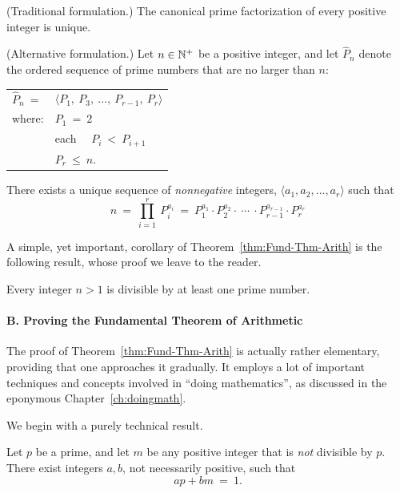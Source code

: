 \begin{theorem}
\label{thm:Fund-Thm-Arith}

\noindent
{\rm (Traditional formulation.)}
%
The canonical prime factorization of every positive integer is unique.

\noindent
{\rm (Alternative formulation.)}
%
Let $n \in \mathbb{N}^+$ be a positive integer, and let $\widehat{P}_n$ denote the
ordered sequence of prime numbers that are no larger than $n$:

\begin{tabular}{ll}
$\widehat{P}_n \ =$  & $\langle P_1, \ P_3, \ \ldots, \ P_{r-1}, \ P_r \rangle$ \\
where:               & $P_1 \ = \ 2$ \\
                     & each  \ \ $P_i \ < \ P_{i+1}$ \\
                     & $P_r \ \leq \ n$.
\end{tabular}

\noindent
There exists a unique sequence of {\em nonnegative} integers, 
$\langle a_1, a_2, \ldots, a_r \rangle$
such that
\[
n \ = \ \prod_{i=1}^r \ P_i^{a_i} \ = \
P_1^{a_1} \cdot P_2^{a_2} \cdot \ \cdots \ \cdot P_{r-1}^{a_{r-1}} \cdot P_r^{a_r}
\]
\end{theorem}

A simple, yet important, corollary of Theorem~\ref{thm:Fund-Thm-Arith}
is the following result, whose proof we leave to the reader.

\begin{prop}
\label{thm:prime-divisor}
Every integer $n>1$ is divisible by at least one prime number.
\end{prop}


\paragraph{\small\sf B. Proving the Fundamental Theorem of Arithmetic}

The proof of Theorem~\ref{thm:Fund-Thm-Arith} is actually rather
elementary, providing that one approaches it gradually.  It employs a
lot of important techniques and concepts involved in ``doing
mathematics'', as discussed in the eponymous
Chapter~\ref{ch:doingmath}.

We begin with a purely technical result.

\begin{prop}
\label{thm:p-n-linear}
Let $p$ be a prime, and let $m$ be any positive integer that is {\em
  not} divisible by $p$.  There exist integers $a, b$, not necessarily
positive, such that
\[ ap + bm \ = \ 1. \]
\end{prop}

